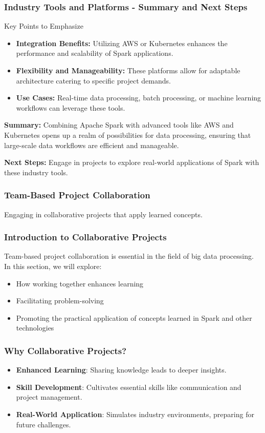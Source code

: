 \documentclass[aspectratio=169]{beamer}
\begin{document}
\begin{frame}[fragile]
  \frametitle{Industry Tools and Platforms - Summary and Next Steps}
  \begin{block}{Key Points to Emphasize}
    \begin{itemize}
      \item \textbf{Integration Benefits:} Utilizing AWS or Kubernetes enhances the performance and scalability of Spark applications.
      \item \textbf{Flexibility and Manageability:} These platforms allow for adaptable architecture catering to specific project demands.
      \item \textbf{Use Cases:} Real-time data processing, batch processing, or machine learning workflows can leverage these tools.
    \end{itemize}
  \end{block}

  \textbf{Summary:} Combining Apache Spark with advanced tools like AWS and Kubernetes opens up a realm of possibilities for data processing, ensuring that large-scale data workflows are efficient and manageable.

  \textbf{Next Steps:} Engage in projects to explore real-world applications of Spark with these industry tools.
\end{frame}

\begin{frame}[fragile]
  \frametitle{Team-Based Project Collaboration}
  Engaging in collaborative projects that apply learned concepts.
\end{frame}

\begin{frame}[fragile]
  \frametitle{Introduction to Collaborative Projects}
  Team-based project collaboration is essential in the field of big data processing. In this section, we will explore:
  \begin{itemize}
    \item How working together enhances learning
    \item Facilitating problem-solving
    \item Promoting the practical application of concepts learned in Spark and other technologies
  \end{itemize}
\end{frame}

\begin{frame}[fragile]
  \frametitle{Why Collaborative Projects?}
  \begin{itemize}
    \item \textbf{Enhanced Learning}: Sharing knowledge leads to deeper insights.
    \item \textbf{Skill Development}: Cultivates essential skills like communication and project management.
    \item \textbf{Real-World Application}: Simulates industry environments, preparing for future challenges.
  \end{itemize}
\end{frame}
\end{document}
